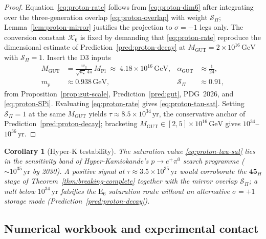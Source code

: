 \documentclass[aps,prd,onecolumn,amsmath,amssymb,nofootinbib,11pt]{revtex4-2}
\numberwithin{equation}{section}
\theoremstyle{plain}
\newtheorem{corollary}[theorem]{Corollary}
\theoremstyle{definition}
\theoremstyle{remark}
\newcommand{\E}[1]{\mathrm{E}_{#1}}
\newcommand{\MPl}{M_{\mathrm{Pl}}}
\begin{document}
\begin{proof}
Equation~\eqref{eq:proton-rate} follows from \eqref{eq:proton-dim6} after
integrating over the three-generation overlap \eqref{eq:proton-overlap} with
weight $\mathcal{S}_\Pi$; Lemma~\ref{lem:proton-mirror} justifies the
projection to $\sigma=-1$ legs only. The conversion constant $\mathcal{K}_{6}$
is fixed by demanding that \eqref{eq:proton-rate} reproduce the dimensional
estimate of Prediction~\ref{pred:proton-decay} at
$M_{\mathrm{GUT}}=2\times 10^{16}\,\mathrm{GeV}$ with $\mathcal{S}_\Pi=1$.
Insert the D3 inputs
\begin{align*}
  M_{\mathrm{GUT}}
  &= \frac{w_3}{\sqrt{\kappa_\star}\,4\pi}\,\MPl
   \;\approx\; 4.18\times 10^{16}\,\mathrm{GeV},
  &
  \alpha_{\mathrm{GUT}} &\approx \tfrac{1}{24},
  \\
  m_p &\approx 0.938\,\mathrm{GeV},
  &
  \mathcal{S}_\Pi &\approx 0.91,
\end{align*}
from Proposition~\ref{prop:gut-scale}, Prediction~\ref{pred:gut}, PDG~2026, and
\eqref{eq:proton-SPi}. Evaluating \eqref{eq:proton-rate} gives
\eqref{eq:proton-tau-sat}. Setting $\mathcal{S}_\Pi=1$ at the same
$M_{\mathrm{GUT}}$ yields $\tau\approx 8.5\times 10^{34}\,\mathrm{yr}$, the
conservative anchor of Prediction~\ref{pred:proton-decay}; bracketing
$M_{\mathrm{GUT}}\in[2,5]\times 10^{16}\,\mathrm{GeV}$ gives
$10^{34}$--$10^{36}\,\mathrm{yr}$.
\end{proof}

\begin{corollary}[Hyper-K testability]\label{cor:proton-hyperk}
The saturation value \eqref{eq:proton-tau-sat} lies in the sensitivity band
of Hyper-Kamiokande's $p\to e^+\pi^0$ search programme ($\sim 10^{35}\,\mathrm{yr}$
by 2030). A positive signal at $\tau\approx 3.5\times 10^{35}\,\mathrm{yr}$
would corroborate the $\mathbf{45}_H$ stage of Theorem~\ref{thm:breaking-complete}
together with the mirror overlap $\mathcal{S}_\Pi$; a null below
$10^{34}\,\mathrm{yr}$ falsifies the $\E{6}$ saturation route without an
alternative $\sigma=+1$ storage mode (Prediction~\ref{pred:proton-decay}).
\end{corollary}

\subsection{Numerical workbook and experimental contact}
\label{sec:proton-decay:numerical}
\end{document}

